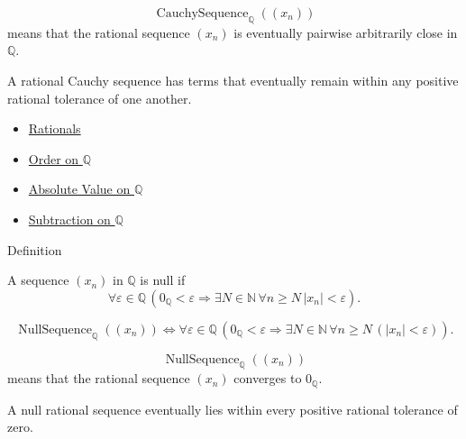 \begin{remark*}
\[
\operatorname{CauchySequence}_{\mathbb{Q}}((x_n))
\]
means that the rational sequence $(x_n)$ is eventually pairwise arbitrarily close in $\mathbb{Q}$.
\end{remark*}

\begin{remark*}[Interpretation]
A rational Cauchy sequence has terms that eventually remain within any positive rational tolerance of one another.
\end{remark*}

\begin{dependencies}
\begin{itemize}
  \item \hyperref[def:rationals]{Rationals}
  \item \hyperref[def:order-on-q]{Order on $\mathbb{Q}$}
  \item \hyperref[def:absolute-value-on-q]{Absolute Value on $\mathbb{Q}$}
  \item \hyperref[def:subtraction-on-q]{Subtraction on $\mathbb{Q}$}
\end{itemize}
\end{dependencies}

\begin{definitionbox}{Definition}
\begin{definition}
\label{def:null-sequence-in-q}
A sequence $(x_n)$ in $\mathbb{Q}$ is null if
\[
\forall\varepsilon\in\mathbb{Q}\,
\left(
0_{\mathbb{Q}}<\varepsilon
\Longrightarrow
\exists N\in\mathbb{N}\,
\forall n\ge N\,
\left|x_n\right|<\varepsilon
\right).
\]
\end{definition}
\end{definitionbox}

\begin{remark*}
\[
\operatorname{NullSequence}_{\mathbb{Q}}((x_n))
\Longleftrightarrow
\forall\varepsilon\in\mathbb{Q}\,
\left(0_{\mathbb{Q}}<\varepsilon
\Longrightarrow
\exists N\in\mathbb{N}\,
\forall n\ge N\,(\left|x_n\right|<\varepsilon)\right).
\]
\end{remark*}

\begin{remark*}
\[
\operatorname{NullSequence}_{\mathbb{Q}}((x_n))
\]
means that the rational sequence $(x_n)$ converges to $0_{\mathbb{Q}}$.
\end{remark*}

\begin{remark*}[Interpretation]
A null rational sequence eventually lies within every positive rational tolerance of zero.
\end{remark*}

